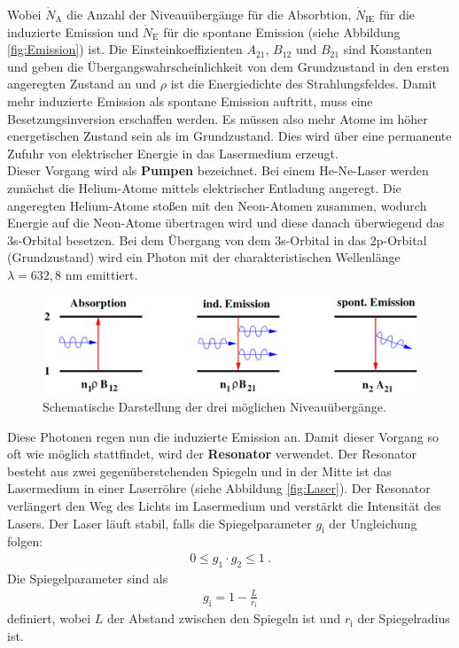 Wobei $\dot{N}_\text{A}$ die Anzahl der Niveauübergänge für die Absorbtion, $\dot{N}_\text{IE}$ für die induzierte Emission und $\dot{N}_\text{E}$ für die spontane Emission (siehe Abbildung \eqref{fig:Emission}) ist. Die Einsteinkoeffizienten $A_{21}$, $B_{12}$ und $B_{21}$ sind Konstanten und geben die Übergangswahrscheinlichkeit von dem Grundzustand in den ersten angeregten Zustand an und $\rho$ ist die Energiedichte des Strahlungsfeldes. Damit mehr induzierte Emission als spontane Emission auftritt, muss eine Besetzungsinversion erschaffen werden. Es müssen also mehr Atome im höher energetischen Zustand sein als im Grundzustand. Dies wird über eine permanente Zufuhr von elektrischer Energie in das Lasermedium erzeugt. \\
Dieser Vorgang wird als \textbf{Pumpen} bezeichnet. Bei einem He-Ne-Laser werden zunächst die Helium-Atome mittels elektrischer Entladung angeregt. Die angeregten Helium-Atome stoßen mit den Neon-Atomen zusammen, wodurch Energie auf die Neon-Atome übertragen wird und diese danach überwiegend das 3s-Orbital besetzen. Bei dem Übergang von dem 3s-Orbital in das 2p-Orbital (Grundzustand) wird ein Photon mit der charakteristischen Wellenlänge $\lambda = 632,8$ nm emittiert.

\begin{figure}[H]
	\includegraphics[width=\linewidth]{Bilder/Emission.pdf}
	\caption{Schematische Darstellung der drei möglichen Niveauübergänge. \cite{V61}}
	\label{fig:Emission}
\end{figure}

Diese Photonen regen nun die induzierte Emission an. Damit dieser Vorgang so oft wie möglich stattfindet, wird der \textbf{Resonator} verwendet. Der Resonator besteht aus zwei gegenüberstehenden Spiegeln und in der Mitte ist das Lasermedium in einer Laserröhre (siehe Abbildung \eqref{fig:Laser}). Der Resonator verlängert den Weg des Lichts im Lasermedium und verstärkt die Intensität des Lasers. Der Laser läuft stabil, falls die Spiegelparameter $g_\text{i}$ der Ungleichung folgen:
\begin{align}
	0 \le g_1 \cdot g_2 \le 1 \ .
	\label{eqn:Stab}
\end{align}
Die Spiegelparameter sind als
\begin{align}
	g_\text{i} = 1 - \frac{L}{r_\text{i}}
\end{align}
definiert, wobei $L$ der Abstand zwischen den Spiegeln ist und $r_\text{i}$ der Spiegelradius ist.

